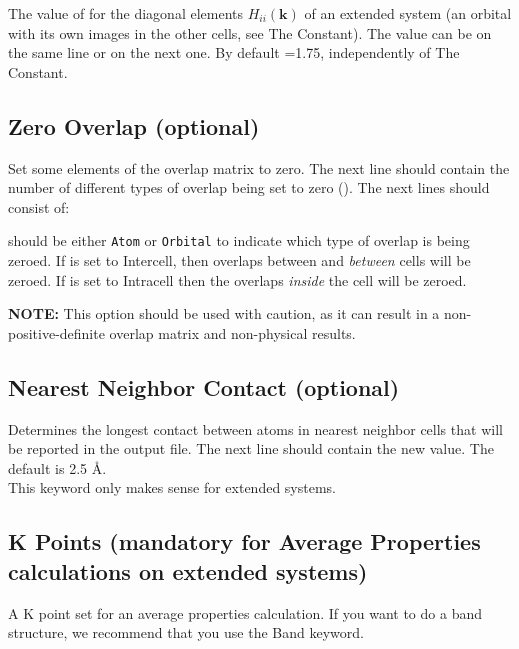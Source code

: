 The value of  for the diagonal elements $H_{ii}(\mathbf{k})$ of an
extended system (an orbital with its own images in the other cells, see
{\sf The Constant}). The value can be on the same line or on the next one.
By default =1.75, independently of {\sf The Constant}.

\subsection{{\sf Zero Overlap} (optional)}

Set some elements of the overlap matrix to zero.  The next line should
contain the number of different types of overlap being set to zero
().  The next  lines should
consist of:

   

 should be either {\tt Atom} or {\tt Orbital} to indicate
which type of overlap is being zeroed.  If  is set to {\sf
Intercell}, then overlaps between  and  
{\em between} cells will be zeroed.  If  is set to {\sf
Intracell} then the overlaps {\em inside} the cell will be zeroed.

{\bf NOTE:}  This option should be used with caution, as it can result
in a non-positive-definite overlap matrix and non-physical results.

\subsection{{\sf Nearest Neighbor Contact} (optional)}

Determines the longest contact between atoms in nearest neighbor cells
that 
will be reported in the output file.  The next line should contain the
new value.  The default is 2.5 \AA. \\

  This keyword only makes sense for extended systems.

\subsection{{\sf K Points} (mandatory for Average Properties
calculations on extended systems)}

A K point set for an average properties calculation.  If you want to
do a band structure, we recommend that you use the {\sf Band} keyword.

